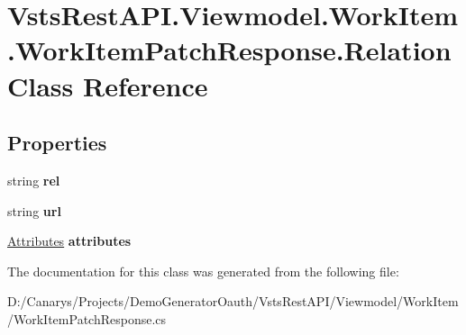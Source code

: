 \hypertarget{class_vsts_rest_a_p_i_1_1_viewmodel_1_1_work_item_1_1_work_item_patch_response_1_1_relation}{}\section{Vsts\+Rest\+A\+P\+I.\+Viewmodel.\+Work\+Item.\+Work\+Item\+Patch\+Response.\+Relation Class Reference}
\label{class_vsts_rest_a_p_i_1_1_viewmodel_1_1_work_item_1_1_work_item_patch_response_1_1_relation}
\subsection*{Properties}
\begin{DoxyCompactItemize}
\item 
\mbox{\label{class_vsts_rest_a_p_i_1_1_viewmodel_1_1_work_item_1_1_work_item_patch_response_1_1_relation_a57cddec88b507196493c0e347136d2e9}} 
string {\bfseries rel}
\item 
\mbox{\label{class_vsts_rest_a_p_i_1_1_viewmodel_1_1_work_item_1_1_work_item_patch_response_1_1_relation_a7f263bebda80e0f171b12e0b0c3eb26a}} 
string {\bfseries url}
\item 
\mbox{\label{class_vsts_rest_a_p_i_1_1_viewmodel_1_1_work_item_1_1_work_item_patch_response_1_1_relation_a4276c3702491dd865ec2a175043cca73}} 
\mbox{\hyperlink{class_vsts_rest_a_p_i_1_1_viewmodel_1_1_work_item_1_1_work_item_patch_response_1_1_attributes}{Attributes}} {\bfseries attributes}
\end{DoxyCompactItemize}


The documentation for this class was generated from the following file\+:\begin{DoxyCompactItemize}
\item 
D\+:/\+Canarys/\+Projects/\+Demo\+Generator\+Oauth/\+Vsts\+Rest\+A\+P\+I/\+Viewmodel/\+Work\+Item/Work\+Item\+Patch\+Response.\+cs\end{DoxyCompactItemize}
